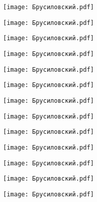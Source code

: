 \documentclass[main.tex]{subfiles}
\begin{document}
\begin{center}
\texttt{[image: Брусиловский.pdf]}
\end{center}



\begin{center}
\texttt{[image: Брусиловский.pdf]}
\end{center}

\begin{center}
\texttt{[image: Брусиловский.pdf]}
\end{center}

\begin{center}
\texttt{[image: Брусиловский.pdf]}
\end{center}

\begin{center}
\texttt{[image: Брусиловский.pdf]}
\end{center}

\begin{center}
\texttt{[image: Брусиловский.pdf]}
\end{center}

\begin{center}
\texttt{[image: Брусиловский.pdf]}
\end{center}

\begin{center}
\texttt{[image: Брусиловский.pdf]}
\end{center}

\begin{center}
\texttt{[image: Брусиловский.pdf]}
\end{center}

\begin{center}
\texttt{[image: Брусиловский.pdf]}
\end{center}

\begin{center}
\texttt{[image: Брусиловский.pdf]}
\end{center}

\begin{center}
\texttt{[image: Брусиловский.pdf]}
\end{center}

\begin{center}
\texttt{[image: Брусиловский.pdf]}
\end{center}
\end{document}
